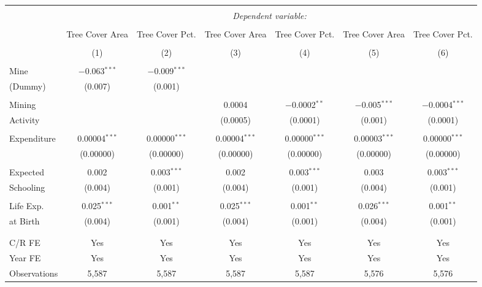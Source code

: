 
\begin{tabular}{@{\extracolsep{5pt}}lcccccc} 
\\[-1.8ex]\hline 
\hline \\[-1.8ex] 
 & \multicolumn{6}{c}{\textit{Dependent variable:}} \\ 
\cline{2-7} 
\\[-1.8ex] & Tree Cover Area & Tree Cover Pct. & Tree Cover Area & Tree Cover Pct. & Tree Cover Area & Tree Cover Pct. \\ 
\\[-1.8ex] & (1) & (2) & (3) & (4) & (5) & (6)\\ 
\hline \\[-1.8ex] 
 Mine & $-$0.063$^{***}$ & $-$0.009$^{***}$ &  &  &  &  \\ 
 (Dummy) & (0.007) & (0.001) &  &  &  &  \\ 
  & & & & & & \\ 
 Mining &  &  & 0.0004 & $-$0.0002$^{**}$ & $-$0.005$^{***}$ & $-$0.0004$^{***}$ \\ 
 Activity &  &  & (0.0005) & (0.0001) & (0.001) & (0.0001) \\ 
  & & & & & & \\ 
 Expenditure & 0.00004$^{***}$ & 0.00000$^{***}$ & 0.00004$^{***}$ & 0.00000$^{***}$ & 0.00003$^{***}$ & 0.00000$^{***}$ \\ 
  & (0.00000) & (0.00000) & (0.00000) & (0.00000) & (0.00000) & (0.00000) \\ 
  & & & & & & \\ 
 Expected & 0.002 & 0.003$^{***}$ & 0.002 & 0.003$^{***}$ & 0.003 & 0.003$^{***}$ \\ 
 Schooling & (0.004) & (0.001) & (0.004) & (0.001) & (0.004) & (0.001) \\ 
  & & & & & & \\ 
 Life Exp. & 0.025$^{***}$ & 0.001$^{**}$ & 0.025$^{***}$ & 0.001$^{**}$ & 0.026$^{***}$ & 0.001$^{**}$ \\ 
 at Birth & (0.004) & (0.001) & (0.004) & (0.001) & (0.004) & (0.001) \\ 
  & & & & & & \\ 
\hline \\[-1.8ex] 
C/R FE & Yes & Yes & Yes & Yes & Yes & Yes \\ 
Year FE & Yes & Yes & Yes & Yes & Yes & Yes \\ 
Observations & 5,587 & 5,587 & 5,587 & 5,587 & 5,576 & 5,576 \\ 

\end{tabular}

